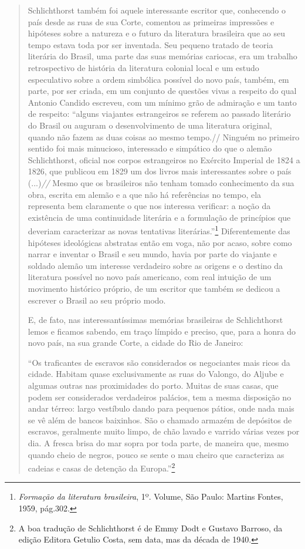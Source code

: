 \begin{quote}
Schlichthorst também foi aquele interessante escritor que, conhecendo o
país desde as ruas de sua Corte, comentou as primeiras impressões e
hipóteses sobre a natureza e o futuro da literatura brasileira que ao
seu tempo estava toda por ser inventada. Seu pequeno tratado de teoria
literária do Brasil, uma parte das suas memórias cariocas, era um
trabalho retrospectivo de história da literatura colonial local e um
estudo especulativo sobre a ordem simbólica possível do novo país,
também, em parte, por ser criada, em um conjunto de questões vivas a
respeito do qual Antonio Candido escreveu, com um mínimo grão de
admiração e um tanto de respeito: ``alguns viajantes estrangeiros se
referem ao passado literário do Brasil ou auguram o desenvolvimento de
uma literatura original, quando não fazem as duas coisas ao mesmo
tempo.// Ninguém no primeiro sentido foi mais minucioso, interessado e
simpático do que o alemão Schlichthorst, oficial nos corpos estrangeiros
no Exército Imperial de 1824 a 1826, que publicou em 1829 um dos livros
mais interessantes sobre o país (...)\emph{//} Mesmo que os brasileiros
não tenham tomado conhecimento da sua obra, escrita em alemão e a que
não há referências no tempo, ela representa bem claramente o que nos
interessa verificar: a noção da existência de uma continuidade literária
e a formulação de princípios que deveriam caracterizar as novas
tentativas literárias.''\footnote{\emph{Formação da literatura
  brasileira}, 1º. Volume, São Paulo: Martins Fontes, 1959, pág.302.}
Diferentemente das hipóteses ideológicas abstratas então em voga, não
por acaso, sobre como narrar e inventar o Brasil e seu mundo, havia por
parte do viajante e soldado alemão um interesse verdadeiro sobre as
origens e o destino da literatura possível no novo país americano, com
real intuição de um movimento histórico próprio, de um escritor que
também se dedicou a escrever o Brasil ao seu próprio modo.

E, de fato, nas interessantíssimas memórias brasileiras de Schlichthorst
lemos e ficamos sabendo, em traço límpido e preciso, que, para a honra
do novo país, na sua grande Corte, a cidade do Rio de Janeiro:

``Os traficantes de escravos são considerados os negociantes mais ricos
da cidade. Habitam quase exclusivamente as ruas do Valongo, do Aljube e
algumas outras nas proximidades do porto. Muitas de suas casas, que
podem ser considerados verdadeiros palácios, tem a mesma disposição no
andar térreo: largo vestíbulo dando para pequenos pátios, onde nada mais
se vê além de bancos baixinhos. São o chamado armazém de depósitos de
escravos, geralmente muito limpo, de chão lavado e varrido várias vezes
por dia. A fresca brisa do mar sopra por toda parte, de maneira que,
mesmo quando cheio de negros, pouco se sente o mau cheiro que
caracteriza as cadeias e casas de detenção da Europa.''\footnote{A boa
  tradução de Schlichthorst é de Emmy Dodt e Gustavo Barroso, da edição
  Editora Getulio Costa, sem data, mas da década de 1940.}


\end{quote}
